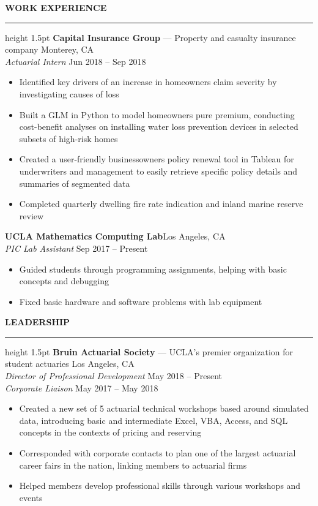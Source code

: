 \documentclass[11pt,letterpaper]{article}
\newcommand{\sectline}{\vspace{4pt}\hrule height 1.5pt\vspace{4pt}}
\newcommand{\sectspace}{\vspace{9pt}}
\begin{document}
\textbf{WORK EXPERIENCE}\sectline
\textbf{Capital Insurance Group} --- Property and casualty insurance company \hfill Monterey, CA \\
\textit{Actuarial Intern} \hfill Jun 2018 -- Sep 2018 
\begin{itemize}
	\item Identified key drivers of an increase in homeowners claim severity by investigating causes of loss
	\item Built a GLM in Python to model homeowners pure premium, conducting cost-benefit analyses on installing water loss prevention devices in selected subsets of high-risk homes 
	\item Created a user-friendly businessowners policy renewal tool in Tableau for underwriters and management to easily retrieve specific policy details and summaries of segmented data
	\item Completed quarterly dwelling fire rate indication and inland marine reserve review
\end{itemize}
\textbf{UCLA Mathematics Computing Lab}\hfill Los Angeles, CA \\
\textit{PIC Lab Assistant} \hfill Sep 2017 -- Present %
\begin{itemize}
	\item Guided students through programming assignments, helping with basic concepts and debugging
	\item Fixed basic hardware and software problems with lab equipment
\end{itemize}
\sectspace


\textbf{LEADERSHIP} \sectline
\textbf{Bruin Actuarial Society} --- UCLA's premier organization for student actuaries \hfill Los Angeles, CA \\
\textit{Director of Professional Development} \hfill May 2018 -- Present \\
\textit{Corporate Liaison} \hfill May 2017 -- May 2018
\begin{itemize}
	\item Created a new set of 5 actuarial technical workshops based around simulated data, introducing basic and intermediate Excel, VBA, Access, and SQL concepts in the contexts of pricing and reserving
	\item Corresponded with corporate contacts to plan one of the largest actuarial career fairs in the nation, linking members to actuarial firms
	\item Helped members develop professional skills through various workshops and events
\end{itemize}
\sectspace
\end{document}
